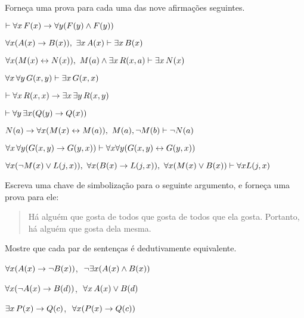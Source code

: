 \problempart
\label{pr.someFOLproofs}
Forneça uma prova para cada uma das nove afirmações seguintes. 
\begin{earg}
\item $\vdash \forall x\,\mathord{F}(x) \rightarrow \forall y(\mathord{F}(y) \wedge \mathord{F}(y))$
\item $\forall x(\mathord{A}(x)\rightarrow \mathord{B}(x)),\,\, \exists x\,\mathord{A}(x) \vdash \exists x\,\mathord{B}(x)$
\item $\forall x(\mathord{M}(x) \leftrightarrow \mathord{N}(x)),\,\, \mathord{M}(a) \wedge \exists x\,\mathord{R}(x,a) \vdash \exists x\,\mathord{N}(x)$
\item $\forall x\, \forall y\,\mathord{G}(x,y)\vdash\exists x\,\mathord{G}(x,x)$
\item $\vdash\forall x\,\mathord{R}(x,x) \rightarrow \exists x\, \exists y\,\mathord{R}(x,y)$
\item $\vdash\forall y\, \exists x (\mathord{Q}(y) \rightarrow \mathord{Q}(x))$
\item $\mathord{N}(a) \rightarrow \forall x(\mathord{M}(x) \leftrightarrow \mathord{M}(a)),\,\, \mathord{M}(a), \neg\mathord{M}(b)\vdash \neg \mathord{N}(a)$
\item $\forall x\, \forall y (\mathord{G}(x,y) \rightarrow \mathord{G}(y,x)) \vdash \forall x\forall y (\mathord{G}(x,y) \leftrightarrow \mathord{G}(y,x))$
\item $\forall x(\neg\mathord{M}(x) \vee \mathord{L}(j,x)), \,\, \forall x(\mathord{B}(x)\rightarrow \mathord{L}(j,x)),\,\, \forall x(\mathord{M}(x)\vee \mathord{B}(x))\vdash \forall x\mathord{L}(j,x)$
\end{earg}
 
\solutions
\problempart
\label{pr.likes}
Escreva uma chave de simbolização para o seguinte argumento, e forneça uma prova para ele:
\begin{quote}
Há alguém que gosta de todos que gosta de todos que ela gosta. Portanto, há alguém que gosta dela mesma.
\end{quote}


\problempart
Mostre que cada par de sentenças é dedutivamente equivalente.
\begin{earg}
\item $\forall x (\mathord{A}(x)\rightarrow \neg \mathord{B}(x))$,\,\, $\neg\exists x(\mathord{A}(x) \wedge \mathord{B}(x))$
\item $\forall x (\neg\mathord{A}(x)\rightarrow \mathord{B}(d))$,\,\, $\forall x\,\mathord{A}(x) \vee \mathord{B}(d)$
\item $\exists x\,\mathord{P}(x) \rightarrow \mathord{Q}(c)$,\,\, $\forall x (\mathord{P}(x) \rightarrow \mathord{Q}(c))$
\end{earg}

